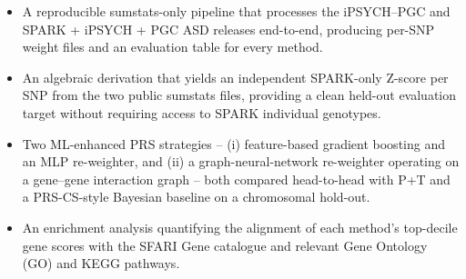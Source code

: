 \begin{itemize}[leftmargin=1.2em,nosep]
  \item A reproducible sumstats-only pipeline that processes the
        iPSYCH--PGC and SPARK + iPSYCH + PGC ASD releases end-to-end,
        producing per-SNP weight files and an evaluation table for every
        method.
  \item An algebraic derivation that yields an independent SPARK-only
        Z-score per SNP from the two public sumstats files, providing a
        clean held-out evaluation target without requiring access to
        SPARK individual genotypes.
  \item Two ML-enhanced PRS strategies -- (i) feature-based gradient
        boosting and an MLP re-weighter, and (ii) a graph-neural-network
        re-weighter operating on a gene--gene interaction graph -- both
        compared head-to-head with P+T and a PRS-CS-style Bayesian
        baseline on a chromosomal hold-out.
  \item An enrichment analysis quantifying the alignment of each method's
        top-decile gene scores with the SFARI Gene catalogue and
        relevant Gene Ontology (GO) and KEGG pathways.
\end{itemize}
